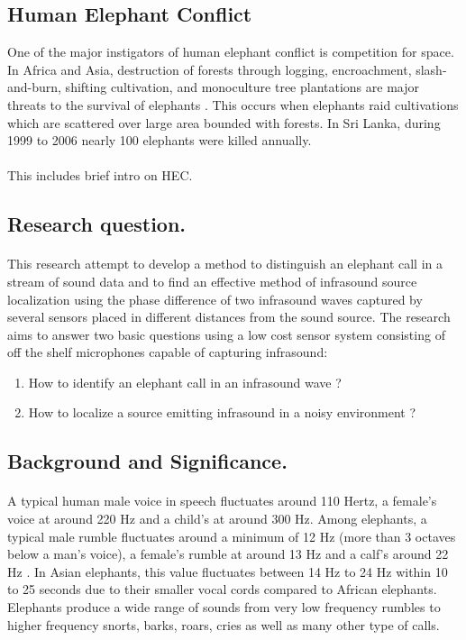 \documentclass[12pt]{article}
\numberwithin{figure}{section}
\numberwithin{table}{section}
\begin{document}
\subsection{Human Elephant Conflict}
One of the major instigators of human elephant conflict is competition for space. In Africa and Asia, destruction of forests through logging, encroachment, slash-and-burn, shifting cultivation, and monoculture tree plantations are major threats to the survival of elephants \cite{28}. This occurs when elephants raid cultivations which are scattered over large area bounded with forests. In Sri Lanka, during 1999 to 2006 nearly 100 elephants were killed annually. 
\paragraph{}
This includes brief intro on HEC.
\subsection{Research question.} 
\paragraph{}
This research attempt to develop a method to distinguish an elephant call in a stream of sound data and to find an effective method of infrasound source localization using the phase difference of two infrasound waves captured by several sensors placed in different distances from the sound source. The research aims to answer two basic questions using a low cost sensor system consisting of off the shelf microphones capable of capturing infrasound:

\begin{enumerate}
\item How to identify an elephant call in an infrasound wave ? 
\item How to  localize a source emitting infrasound in a noisy environment ?
\end{enumerate}


\subsection{Background and Significance.} 

\paragraph{}
A typical human male voice in speech fluctuates around 110 Hertz, a female's voice at around 220 Hz and a child's at around 300 Hz. Among elephants, a typical male rumble fluctuates around a minimum of 12 Hz (more than 3 octaves below a man's voice), a female's rumble at around 13 Hz and a calf's around 22 Hz \cite {1} \cite {2}. In Asian elephants, this value fluctuates between 14 Hz to 24 Hz within 10 to 25 seconds \cite {3} due to their smaller vocal cords compared to African elephants.  Elephants produce a wide range  of sounds from very low frequency rumbles to higher frequency snorts, barks, roars, cries as well as many other type of  calls. 
\end{document}
